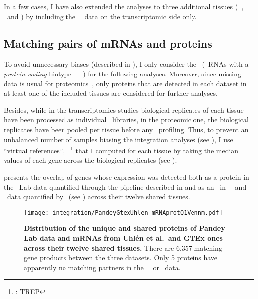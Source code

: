In a few cases, I have also extended the analyses
to three additional tissues (\ie\ \Gall, \Placenta\ and \Rectum)
by including the \uhlen\ \etal\ data on the transcriptomic side only.

\subsection{Matching pairs of mRNAs and proteins}

To avoid unnecessary biases (described in ),
I only consider the \mRNAs\
(\ie\ \glspl{RNA} with a \emph{protein-coding} biotype --- )
for the following analyses.
Moreover, since missing data is usual for proteomics~,
only proteins that are detected in each dataset
in at least one of the included tissues
are considered for further analyses.

Besides,
while in the transcriptomics studies
biological replicates of each tissue have been processed
as individual \Rnaseq\ libraries,
in the proteomic one,
the biological replicates have been pooled per tissue before any \ms\ profiling.
Thus, to prevent an unbalanced number of samples biasing
the integration analyses (see ),
I use \enquote{virtual references},
\ie\ \treps\footnote{\trep{}: \glsdesc{TREP}}
that I computed for each tissue
by taking the median values of each gene
across the biological replicates
(see ).

 presents the overlap of genes
whose expression was detected
both as a protein in the \pandey\ Lab data quantified 
through the pipeline described in 
and as an \mRNAs\ in \uhlen\ \etal\ and \gtex\ data quantified by \htseq\
(see ) across their twelve shared tissues.

\begin{figure}[!htb]
    \texttt{[image: integration/PandeyGtexUhlen\_mRNAprotQ1Vennm.pdf]}\centering
    \vspace{-5mm}
    \caption[Distribution of the unique and shared proteins/mRNAs for the three datasets
    across twelve tissues]{%
    \label{fig:PGU_vennQ1}\textbf{Distribution of the unique and shared proteins
    of Pandey Lab data and mRNAs from Uhlén et al.\ and GTEx ones across
    their twelve shared tissues.}
    There are 6,357 matching gene products between the three datasets.
    Only 5 proteins have apparently no matching partners
    in the \uhlen\ \etal\ or \gtex\ data.}
\end{figure}

